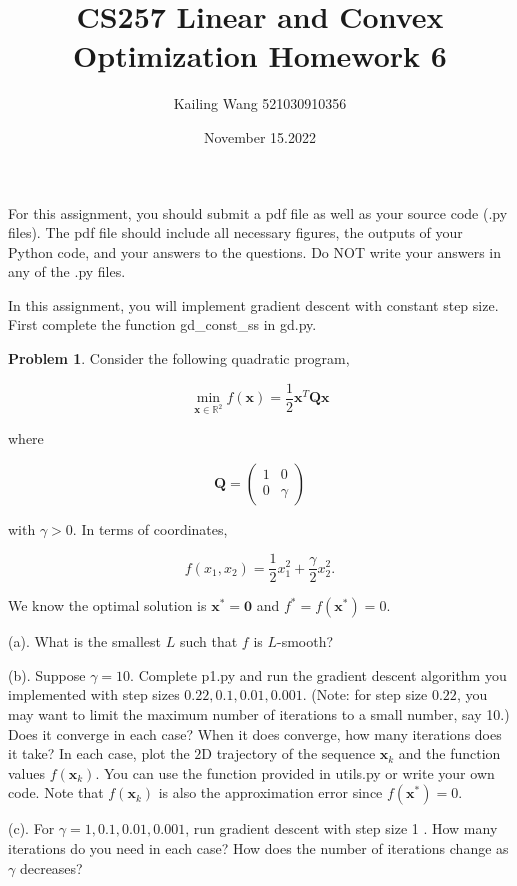 \documentclass{article}
\theoremstyle{definition}
\newtheorem{prob}{Problem}
\begin{document}
	\title{CS257 Linear and Convex Optimization Homework 6 }
	\author{Kailing Wang 521030910356}
	\date{November 15.2022}
	\maketitle
	For this assignment, you should submit a pdf file as well as your source code (.py files). The pdf file should include all necessary figures, the outputs of your Python code, and your answers to the questions. Do NOT write your answers in any of the .py files.
	
	In this assignment, you will implement gradient descent with constant step size. First complete the function gd\_const\_ss in gd.py.
	
	\begin{prob}
	Consider the following quadratic program,

	
	$$
	\min _{\boldsymbol{x} \in \mathbb{R}^{2}} f(\boldsymbol{x})=\frac{1}{2} \boldsymbol{x}^{T} \boldsymbol{Q} \boldsymbol{x}
	$$
	
	where
	
	$$
	\boldsymbol{Q}=\left(\begin{array}{ll}
		1 & 0 \\
		0 & \gamma
	\end{array}\right)
	$$
	
	with $\gamma>0$. In terms of coordinates,
	
	$$
	f\left(x_{1}, x_{2}\right)=\frac{1}{2} x_{1}^{2}+\frac{\gamma}{2} x_{2}^{2} .
	$$
	
	We know the optimal solution is $\boldsymbol{x}^{*}=\mathbf{0}$ and $f^{*}=f\left(\boldsymbol{x}^{*}\right)=0$.
	
	(a). What is the smallest $L$ such that $f$ is $L$-smooth?
	
	(b). Suppose $\gamma=10$. Complete p1.py and run the gradient descent algorithm you implemented with step sizes $0.22,0.1,0.01,0.001$. (Note: for step size $0.22$, you may want to limit the maximum number of iterations to a small number, say 10.) Does it converge in each case? When it does converge, how many iterations does it take? In each case, plot the $2 \mathrm{D}$ trajectory of the sequence $\boldsymbol{x}_{k}$ and the function values $f\left(\boldsymbol{x}_{k}\right)$. You can use the function provided in utils.py or write your own code. Note that $f\left(\boldsymbol{x}_{k}\right)$ is also the approximation error since $f\left(\boldsymbol{x}^{*}\right)=0$.
	
	(c). For $\gamma=1,0.1,0.01,0.001$, run gradient descent with step size 1 . How many iterations do you need in each case? How does the number of iterations change as $\gamma$ decreases?
	\end{prob}
\end{document}
